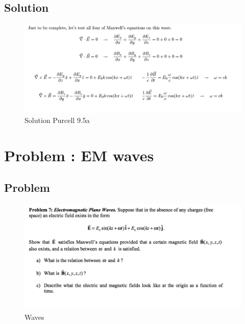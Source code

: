 \documentclass[solutions]{esg8022pset}
\begin{document}
\subsection{Solution}
 \begin{figure}[H]
    \centering
    \includegraphics[width = 15cm]{solpu905a}
    \caption{Solution Purcell 9.5a}
  \end{figure}
\section{Problem \thesection: EM waves}
\subsection{Problem}
\begin{figure}[H]
    \centering
    \includegraphics[width = 15cm]{waves2}
   \caption{Waves}
  \end{figure}
\end{document}
